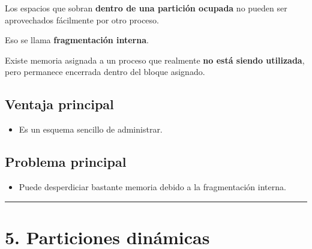 \documentclass[
  spanish,
  letterpaper,
]{scrbook}
\providecommand{\tightlist}{%
  \setlength{\itemsep}{0pt}\setlength{\parskip}{0pt}}
\begin{document}
Los espacios que sobran \textbf{dentro de una partición ocupada} no
pueden ser aprovechados fácilmente por otro proceso.

Eso se llama \textbf{fragmentación interna}.

\begin{tcolorbox}[enhanced jigsaw, arc=.35mm, bottomrule=.15mm, bottomtitle=1mm, breakable, colback=white, colbacktitle=quarto-callout-warning-color!10!white, colframe=quarto-callout-warning-color-frame, coltitle=black, left=2mm, leftrule=.75mm, opacityback=0, opacitybacktitle=0.6, rightrule=.15mm, title=\textcolor{quarto-callout-warning-color}{\faExclamationTriangle}\hspace{0.5em}{Fragmentación interna}, titlerule=0mm, toprule=.15mm, toptitle=1mm]

Existe memoria asignada a un proceso que realmente \textbf{no está
siendo utilizada}, pero permanece encerrada dentro del bloque asignado.

\end{tcolorbox}

\section{Ventaja principal}\label{ventaja-principal}

\begin{itemize}
\tightlist
\item
  Es un esquema sencillo de administrar.
\end{itemize}

\section{Problema principal}\label{problema-principal}

\begin{itemize}
\tightlist
\item
  Puede desperdiciar bastante memoria debido a la fragmentación interna.
\end{itemize}

\begin{center}\rule{0.5\linewidth}{0.5pt}\end{center}


\chapter{5. Particiones dinámicas}\label{particiones-dinuxe1micas}
\end{document}
